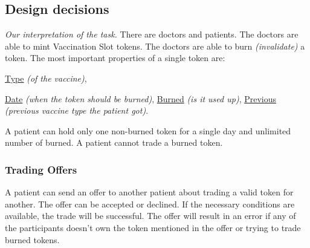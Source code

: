 \newcommand{\function}[4]{
  \textbf{#1}%
  (\emph{#2}):
  #3 \newline
  \emph{\color{teal} #4}
}

\newcommand{\gopkg}[2]{
  \href{https://pkg.go.dev/github.com/perryd01/vaccination-slot/chaincode#1}{#2}%
}

\newcommand{\testStruct}[3]{
  \subsubsection{#1}
  \paragraph*{Steps}
  \begin{enumerate}
    #2
  \end{enumerate}
  \textbf{Expected outcome:} #3
}

\newcommand{\vsType}[0]{\gopkg{\#VaccinationType}{Type}}
\newcommand{\vsDate}[0]{\gopkg{\#VaccinationDate}{Date}}


\subsection{Design decisions}
\emph{Our interpretation of the task.} There are doctors and patients. The doctors are able to mint Vaccination Slot tokens. The doctors are able to burn \emph{(invalidate)} a token. The most important properties of a single token are:%
\vsType \emph{(of the vaccine)},
\vsDate \emph{(when the token should be burned)},
\href{https://pkg.go.dev/github.com/perryd01/vaccination-slot/chaincode\#VaccinationDate}{Burned} \emph{(is it used up)},
\href{https://pkg.go.dev/github.com/perryd01/vaccination-slot/chaincode\#VaccinationSlotData}{Previous} \emph{(previous vaccine type the patient got)}.

A patient can hold only one non-burned token for a single day and unlimited number of burned. A patient cannot trade a burned token.

\subsubsection{Trading Offers}
A patient can send an offer to another patient about trading a valid token for another. The offer can be accepted or declined. If the necessary conditions are available, the trade will be successful.
The offer will result in an error if any of the participants doesn't own the token mentioned in the offer or trying to trade burned tokens.



